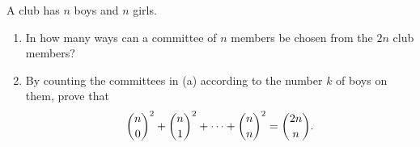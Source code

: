 A club has $n$ boys and $n$ girls.
\begin{enumerate}
\item[(a)] In how many ways can a committee of $n$ members be chosen from the $2n$ club members?
\item[(b)] By counting the committees in (a) according to the number $k$ of boys on them, prove that
\[
\dbinom{n}{0}^2+\dbinom{n}{1}^2+\cdots+\dbinom{n}{n}^2=\dbinom{2n}{n}.
\]
\end{enumerate}
